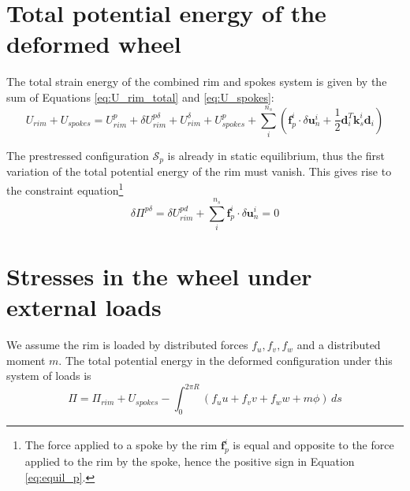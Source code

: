 \documentclass[\rootdir/thesis.tex]{subfiles}
\begin{document}
\section{Total potential energy of the deformed wheel}

The total strain energy of the combined rim and spokes system is given by the sum of Equations \eqref{eq:U_rim_total} and \eqref{eq:U_spokes}:
\begin{equation}
\label{eq:U_total}
U_{rim} + U_{spokes} = U_{rim}^p + \delta U_{rim}^{p\delta} + U_{rim}^{\delta} + 
	U_{spokes}^p + \sum_i^{n_s} \left(\mathbf{f}_p^i \cdot \delta\mathbf{u}_n^i +
    \frac{1}{2}\mathbf{d}_i^T \mathbf{k}_s^i \mathbf{d}_i\right)
\end{equation}

The prestressed configuration $\mathcal{S}_p$ is already in static equilibrium, thus the first variation of the total potential energy of the rim must vanish. This gives rise to the constraint equation\footnote{The force applied to a spoke by the rim $\mathbf{f}_p^i$ is equal and opposite to the force applied to the rim by the spoke, hence the positive sign in Equation \eqref{eq:equil_p}.}
\begin{equation}
\label{eq:equil_p}
\delta\Pi^{p\delta} = \delta U_{rim}^{pd} + \sum_i^{n_s} \mathbf{f}_p^i \cdot \delta\mathbf{u}_n^i = 0
\end{equation}

\section{Stresses in the wheel under external loads}

We assume the rim is loaded by distributed forces $f_u,f_v,f_w$ and a distributed moment $m$. The total potential energy in the deformed configuration under this system of loads is
\begin{equation}
\label{eq:TotPot}
\Pi = \Pi_{rim} + U_{spokes} - \int_0^{2\pi R} (f_uu+f_vv+f_ww+m\phi)\, ds
\end{equation}
\end{document}
